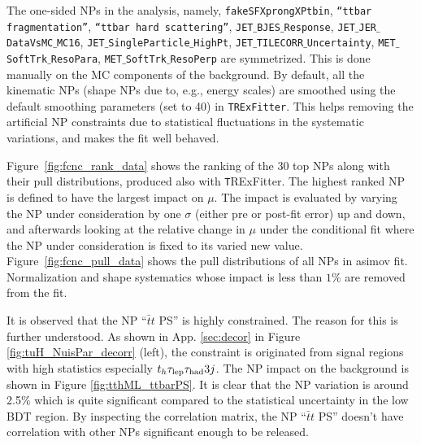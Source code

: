 The one-sided NPs in the analysis, namely, \texttt{fakeSFXprongXPtbin}, \texttt{``ttbar fragmentation''}, \texttt{``ttbar hard scattering''}, \texttt{JET$\_$BJES$\_$Response}, \texttt{JET$\_$JER$\_$DataVsMC$\_$MC16}, \texttt{JET$\_$SingleParticle$\_$HighPt}, \texttt{JET$\_$TILECORR$\_$Uncertainty}, \texttt{MET$\_$SoftTrk$\_$ResoPara}, \texttt{MET$\_$SoftTrk$\_$ResoPerp} are symmetrized. This is done manually on the MC components of the background. By default, all the kinematic NPs (shape NPs due to, e.g., energy scales) are smoothed using the default smoothing parameters (set to 40) in \texttt{TRExFitter}. This helps removing the artificial NP constraints due to statistical fluctuations in the systematic variations, and makes the fit well behaved. %

Figure~\ref{fig:fcnc_rank_data} shows the ranking of the 30 top NPs along with their pull distributions, produced also with {\texttt TRExFitter}. The highest ranked NP is defined to have the largest impact on $\mu$. The impact is evaluated by varying the NP under consideration by one $\sigma$ (either pre or post-fit error) up and down, and afterwards looking at the relative change in $\mu$ under the conditional fit where the NP under consideration is fixed to its varied new value.
Figure~\ref{fig:fcnc_pull_data} shows the pull distributions of all NPs in asimov fit. %
Normalization and shape systematics whose impact is less than $1\%$ are removed from the fit. %

It is observed that the NP ``$\bar{t}t$ PS'' is highly constrained. The reason for this is further understood. As shown in App. \ref{sec:decor} in Figure \ref{fig:tuH_NuisPar_decorr} (left), the constraint is originated from signal regions with high statistics especially $t_h\tau_\text{lep}{}\tau_\text{had} 3j$. The NP impact on the background is shown in Figure \ref{fig:tthML_ttbarPS}. It is clear that the NP variation is around 2.5\% which is quite significant compared to the statistical uncertainty in the low BDT region. By inspecting the correlation matrix, the NP ``$\bar{t}t$ PS'' doesn't have correlation with other NPs significant enough to be released.

